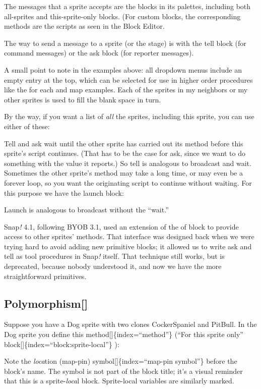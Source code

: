 \documentclass[
  letterpaper,
]{book}
\begin{document}
The messages that a sprite accepts are the blocks in its palettes,
including both all-sprites and this-sprite-only blocks. (For custom
blocks, the corresponding methods are the scripts as seen in the Block
Editor.

The way to send a message to a sprite (or the stage) is with the tell
block (for command messages) or the ask block (for reporter messages).

A small point to note in the examples above: all dropdown menus include
an empty entry at the top, which can be selected for use in higher order
procedures like the for each and map examples. Each of the sprites in my
neighbors or my other sprites is used to fill the blank space in turn.

By the way, if you want a list of \emph{all} the sprites, including this
sprite, you can use either of these:

Tell and ask wait until the other sprite has carried out its method
before this sprite's script continues. (That has to be the case for ask,
since we want to do something with the value it reports.) So tell is
analogous to broadcast and wait. Sometimes the other sprite's method may
take a long time, or may even be a forever loop, so you want the
originating script to continue without waiting. For this purpose we have
the launch block:

Launch is analogous to broadcast without the ``wait.''

Snap\emph{!} 4.1, following BYOB 3.1, used an extension of the of block
to provide access to other sprites' methods. That interface was designed
back when we were trying hard to avoid adding new primitive blocks; it
allowed us to write ask and tell as tool procedures in Snap\emph{!}
itself. That technique still works, but is deprecated, because nobody
understood it, and now we have the more straightforward primitives.

\subsection{Polymorphism{[}{]}}\label{polymorphism}

Suppose you have a Dog sprite with two clones CockerSpaniel and PitBull.
In the Dog sprite you define this method{[}{]}\{index=``method''\}
(``For this sprite only'' block{[}{]}\{index=``block:sprite-local''\} ):

Note the \emph{loca}tion (map-pin) symbol{[}{]}\{index=``map-pin
symbol''\} before the block's name. The symbol is not part of the block
title; it's a visual reminder that this is a sprite-\emph{loca}l block.
Sprite-local variables are similarly marked.
\end{document}
